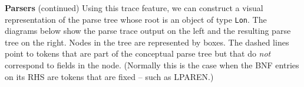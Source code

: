 \begin{minipage}[t]{\sw}
\slidenumber
\LARGE
{\bf Parsers} (continued)\exx
Using this trace feature,
we can construct a visual representation of the parse tree
whose root is an object of type \verb'Lon'.
The diagrams below show the parse trace output on the left
and the resulting parse tree on the right.
Nodes in the tree are represented by boxes.
The dashed lines point to tokens
that are part of the conceptual parse tree
but that do {\em not} correspond to fields in the node.
(Normally this is the case when the BNF entries on its RHS
are tokens that are fixed -- such as LPAREN.)\exx
\centerline{}\exx
\end{minipage}
\clearpage
